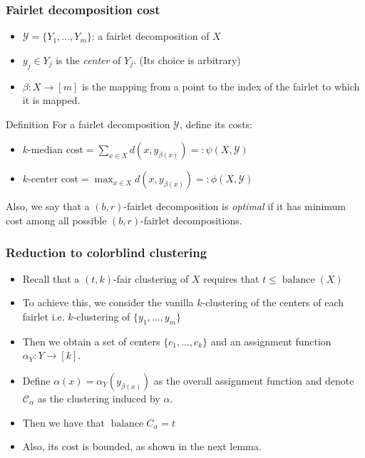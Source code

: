 \documentclass{beamer}
\DeclareMathOperator{\balance}{balance}
\begin{document}
\begin{frame}
\frametitle{Fairlet decomposition cost}

\begin{itemize}
	\item $\mathcal{Y} = \{ Y_1, \dots, Y_m \}$: a fairlet decomposition of $X$
	\item $y_j \in Y_j$ is the {\it center} of $Y_j$. (Its choice is arbitrary)
	\item $\beta : X \rightarrow [m]$ is the mapping from a point to the index of the fairlet to which it is mapped.
\end{itemize}

\begin{block}{Definition}
For a fairlet decomposition $\mathcal{Y}$, define its costs:

\begin{itemize}
	\item $k \text{-median cost} = \sum_{x \in X} d \left(x, y_{\beta(x)}\right) =: \psi(X, \mathcal{Y})$
	\item $k \text{-center cost} = \max_{x \in X} d \left(x, y_{\beta(x)}\right) =: \phi(X, \mathcal{Y})$
\end{itemize}

Also, we say that a $(b, r)$-fairlet decomposition is {\it optimal} if it has minimum cost among all possible $(b, r)$-fairlet decompositions.
\end{block}

\end{frame}



\begin{frame}
\frametitle{Reduction to colorblind clustering}

\begin{itemize}
	\item Recall that a $(t, k)$-fair clustering of $X$ requires that $t \leq \balance(X)$ \pause
	
	\item To achieve this, we consider the vanilla $k$-clustering of the \alert{centers of each fairlet} i.e. $k$-clustering of $\{y_1, \dots, y_m\}$ \pause
	
	\item Then we obtain a set of centers $\{c_1, \dots, c_k\}$ and an assignment function $\alpha_Y : Y \rightarrow [k]$. \pause
	
	\item Define $\alpha(x) = \alpha_Y(y_{\beta(x)})$ as the overall assignment function and denote $\mathcal{C}_\alpha$ as the clustering induced by $\alpha$. \pause
	
	\item Then we have that $\balance{C_\alpha} = t$ \pause
	
	\item Also, its cost is bounded, as shown in the next lemma.
\end{itemize}

\end{frame}
\end{document}
